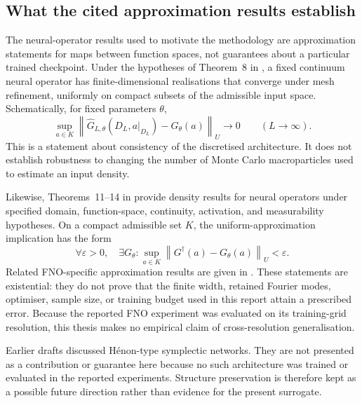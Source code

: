 \documentclass[11pt,a4paper]{article}
\providecommand{\norm}[1]{\left\lVert#1\right\rVert}
\begin{document}
\begin{sloppypar}
\subsection{What the cited approximation results establish}

The neural-operator results used to motivate the methodology are approximation statements for maps between function spaces, not guarantees about a particular trained checkpoint. Under the hypotheses of Theorem~8 in \cite{kovachki_neural_2023}, a fixed continuum neural operator has finite-dimensional realisations that converge under mesh refinement, uniformly on compact subsets of the admissible input space. Schematically, for fixed parameters \(\theta\),
\begin{equation}
    \sup_{a\in K}
    \norm{
        \widehat{G}_{L,\theta}(D_L,a|_{D_L})-G_{\theta}(a)
    }_{U}
    \longrightarrow 0
    \qquad (L\to\infty).
    \label{eq:app_discretisation}
\end{equation}
This is a statement about consistency of the discretised architecture. It does not establish robustness to changing the number of Monte Carlo macroparticles used to estimate an input density.

Likewise, Theorems~11--14 in \cite{kovachki_neural_2023} provide density results for neural operators under specified domain, function-space, continuity, activation, and measurability hypotheses. On a compact admissible set \(K\), the uniform-approximation implication has the form
\begin{equation}
    \forall\varepsilon>0,\quad
    \exists G_{\theta}:
    \sup_{a\in K}
    \norm{G^{\dagger}(a)-G_{\theta}(a)}_{U}
    <\varepsilon.
    \label{eq:app_operator_approximation}
\end{equation}
Related FNO-specific approximation results are given in \cite{kovachki_universal_2021}. These statements are existential: they do not prove that the finite width, retained Fourier modes, optimiser, sample size, or training budget used in this report attain a prescribed error. Because the reported FNO experiment was evaluated on its training-grid resolution, this thesis makes no empirical claim of cross-resolution generalisation.

Earlier drafts discussed Hénon-type symplectic networks. They are not presented as a contribution or guarantee here because no such architecture was trained or evaluated in the reported experiments. Structure preservation is therefore kept as a possible future direction rather than evidence for the present surrogate.


\end{sloppypar}
\end{document}
